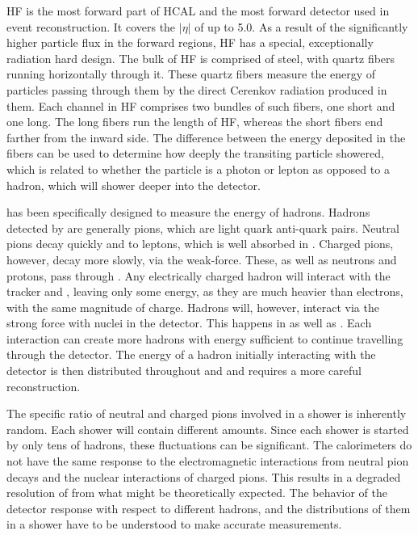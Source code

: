 HF is the most forward part of HCAL and the most forward detector used in event reconstruction.  It covers the \ensuremath{|\eta|} of up to 5.0.  As a result of the significantly higher particle flux in the forward regions, HF has a special, exceptionally radiation hard design. The bulk of HF is comprised of steel, with quartz fibers running horizontally through it. These quartz fibers measure the energy of particles passing through them by the direct Cerenkov radiation produced in them. Each channel in HF comprises two bundles of such fibers, one short and one long. The long fibers run the length of HF, whereas the short fibers end farther from the inward side. The difference between the energy deposited in the fibers can be used to determine how deeply the transiting particle showered, which is related to whether the particle is a photon or lepton as opposed to a hadron, which will shower deeper into the detector.

\HCAL has been specifically designed to measure the energy of hadrons.  Hadrons detected by \HCAL are generally pions, which are light quark anti-quark pairs.  Neutral pions decay quickly and to leptons, which is well absorbed in \ECAL.  Charged pions, however, decay more slowly, via the weak-force. These, as well as neutrons and protons, pass through \ECAL.  Any electrically charged hadron will interact with the tracker and \ECAL, leaving only some energy, as they are much heavier than electrons, with the same magnitude of charge. Hadrons will, however, interact via the strong force with nuclei in the detector. This happens in \ECAL as well as \HCAL. Each interaction can create more hadrons with energy sufficient to continue travelling through the detector. The energy of a hadron initially interacting with the detector is then distributed throughout \ECAL and \HCAL and requires a more careful reconstruction.

The specific ratio of neutral and charged pions involved in a shower is inherently random.  Each shower will contain different amounts.  Since each shower is started by only tens of hadrons, these fluctuations can be significant.  The calorimeters do not have the same response to the electromagnetic interactions from neutral pion decays and the nuclear interactions of charged pions.  This results in a degraded resolution of \HCAL from what might be theoretically expected.  The behavior of the detector response with respect to different hadrons, and the distributions of them in a shower have to be understood to make accurate measurements.

